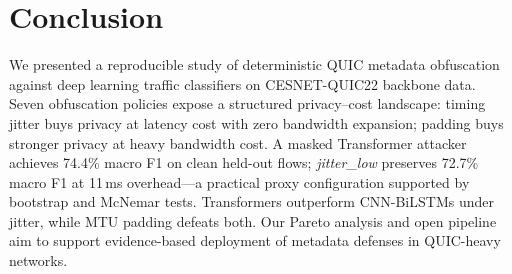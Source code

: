 \section{Conclusion}
\label{sec:conclusion}

We presented a reproducible study of deterministic QUIC metadata obfuscation against
deep learning traffic classifiers on CESNET-QUIC22 backbone data. Seven obfuscation
policies expose a structured privacy--cost landscape: timing jitter buys privacy at
latency cost with zero bandwidth expansion; padding buys stronger privacy at heavy
bandwidth cost. A masked Transformer attacker achieves 74.4\% macro F1 on clean held-out
flows; \emph{jitter\_low} preserves 72.7\% macro F1 at 11\,ms overhead---a practical
proxy configuration supported by bootstrap and McNemar tests. Transformers outperform
CNN-BiLSTMs under jitter, while MTU padding defeats both. Our Pareto analysis and open
pipeline aim to support evidence-based deployment of metadata defenses in QUIC-heavy
networks.

